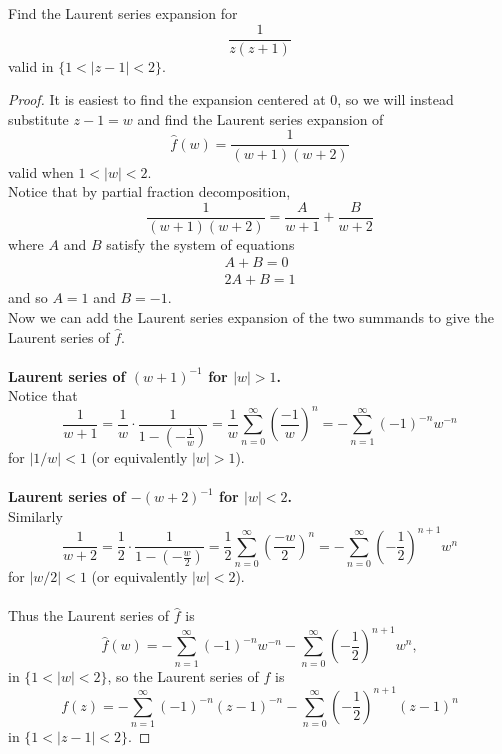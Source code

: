 \documentclass{article}
\newenvironment{problem}[2][Problem]{\begin{trivlist}
\item[\hskip \labelsep {\bfseries #1}\hskip \labelsep {\bfseries #2.}]}{\end{trivlist}}
\begin{document}
\begin{problem}{2}
  Find the Laurent series expansion for \[
    \frac{1}{z(z+1)}
  \] valid in $\{ 1 < |z - 1| < 2\}$.
\end{problem}

\begin{proof}
  It is easiest to find the expansion centered at $0$, so we will instead
  substitute $z - 1 = w$ and find the Laurent series expansion of \[
    \hat f(w) = \frac{1}{(w + 1)(w + 2)}
  \] valid when $1 < |w| < 2$.
  \\
  Notice that by partial fraction decomposition, \[
    \frac{1}{(w + 1)(w + 2)} = \frac{A}{w + 1} + \frac{B}{w + 2}
  \] where $A$ and $B$ satisfy the system of equations \begin{align*}
      A + B = 0 \\
      2A + B = 1
  \end{align*} and so $A = 1$ and $B = -1$.
  \\
  Now we can add the Laurent series expansion of the two summands to give the
  Laurent series of $\hat f$.
  \\~\\
  \textbf{Laurent series of $(w+1)^{-1}$ for $|w| > 1$.}\\
  Notice that \[
    \frac{1}{w + 1} = \frac{1}{w}\cdot\frac{1}{1 - (-\frac{1}{w})}
    = \frac{1}{w}\sum_{n=0}^\infty\left(\frac{-1}{w}\right)^n
    = -\sum_{n=1}^\infty (-1)^{-n}w^{-n}
  \] for $|1/w| < 1$ (or equivalently $|w| > 1$).
  \\~\\
  \textbf{Laurent series of $-(w+2)^{-1}$ for $|w| < 2$.}\\
  Similarly \[
    \frac{1}{w + 2} = \frac{1}{2}\cdot\frac{1}{1 - (-\frac{w}{2})}
    = \frac{1}{2}\sum_{n=0}^\infty\left(\frac{-w}{2}\right)^n
    = -\sum_{n=0}^\infty \left(-\frac{1}{2}\right)^{n+1}w^n
  \] for $|w/2| < 1$ (or equivalently $|w| < 2$).
  \\~\\
  Thus the Laurent series of $\hat f$ is \[
    \hat f(w) = -\sum_{n=1}^\infty (-1)^{-n}w^{-n}
    -\sum_{n=0}^\infty \left(-\frac{1}{2}\right)^{n+1}w^n,
  \] in $\{ 1 < |w| < 2\}$, so the Laurent series of $f$ is \[
    f(z) = -\sum_{n=1}^\infty (-1)^{-n}(z - 1)^{-n}
    -\sum_{n=0}^\infty \left(-\frac{1}{2}\right)^{n+1}(z - 1)^n
  \] in $\{ 1 < |z - 1| < 2\}$.
\end{proof}

\pagebreak
\end{document}
